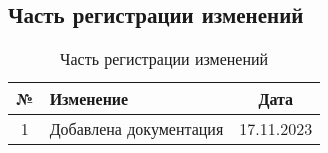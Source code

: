 \documentclass{article}
\begin{document}
\subsection{Часть регистрации изменений}

\begin{table}[h]
  \centering
  \caption{Часть регистрации изменений}
  \begin{tabular}{|c|p{8cm}|c|}
    \hline
    \textbf{№} & \textbf{Изменение}     & \textbf{Дата} \\
    \hline
    1          & Добавлена документация & 17.11.2023    \\
    \hline
  \end{tabular}
\end{table}
\end{document}

